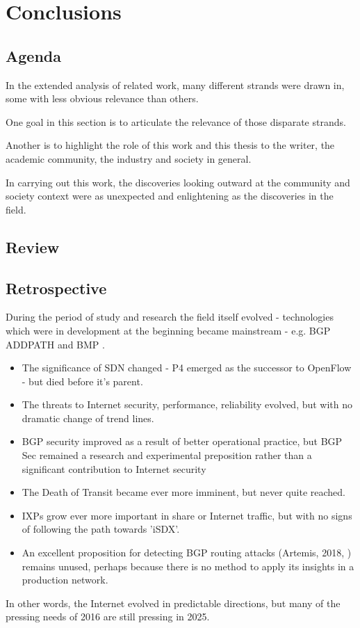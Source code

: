 \chapter{Conclusions}
\section{Agenda}

In the extended analysis of related work, many different strands were drawn in, some with less obvious relevance than others.

One goal in this section is to articulate the relevance of those disparate strands.

Another is to highlight the role of this work and this thesis to the writer, the academic community, the industry and society in general.

In carrying out this work, the discoveries looking outward at the community and society context were as unexpected and enlightening as the discoveries in the field.




\section{Review}

\section{Retrospective}

During the period of study and research the field itself evolved - technologies which were in development at the beginning became mainstream - e.g. BGP ADDPATH \cite{rfc7911} and BMP \cite{Fernando2016}.

\begin{itemize}
    \item The significance of SDN changed - P4 emerged as the successor to OpenFlow - but died before it's parent.
    \item The threats to Internet security, performance, reliability evolved, but with no dramatic change of trend lines.
    \item BGP security improved as a result of better operational practice, but BGP Sec\cite{rfc8205} remained a research and experimental preposition rather than a significant contribution to Internet security
    \item The Death of Transit \cite{Huston2017} became ever more imminent, but never quite reached.
    \item IXPs grow ever more important in share or Internet traffic, but with no signs of following the path towards 'iSDX'.\cite{Gupta2016}
    \item An  excellent proposition for detecting BGP routing attacks (Artemis, 2018, \cite{Sermpezis2018}) remains unused, perhaps because there is no method to apply its insights in a production network.
\end{itemize}
In other words, the Internet evolved in predictable directions, but many of the pressing needs of 2016 are still pressing in 2025.

